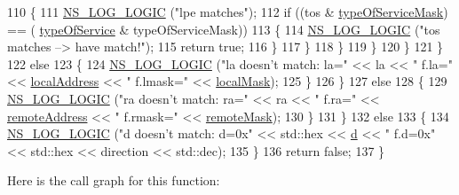 \begin{DoxyCode}
110                             \{
111                               \hyperlink{group__logging_ga88acd260151caf2db9c0fc84997f45ce}{NS\_LOG\_LOGIC} (\textcolor{stringliteral}{"lpe matches"});
112                               \textcolor{keywordflow}{if} ((tos & \hyperlink{structns3_1_1EpcTft_1_1PacketFilter_ad97ae3369224f9b909765a6fc473f3e2}{typeOfServiceMask}) == (
      \hyperlink{structns3_1_1EpcTft_1_1PacketFilter_abd62754182d9af89f6bc5fdc51a609ae}{typeOfService} & typeOfServiceMask))
113                                 \{
114                                   \hyperlink{group__logging_ga88acd260151caf2db9c0fc84997f45ce}{NS\_LOG\_LOGIC} (\textcolor{stringliteral}{"tos matches --> have match!"});
115                                   \textcolor{keywordflow}{return} \textcolor{keyword}{true};
116                                 \}
117                             \}
118                         \}
119                     \}
120                 \}
121             \}
122           \textcolor{keywordflow}{else}
123             \{
124               \hyperlink{group__logging_ga88acd260151caf2db9c0fc84997f45ce}{NS\_LOG\_LOGIC} (\textcolor{stringliteral}{"la doesn't match: la="} << la << \textcolor{stringliteral}{" f.la="} << 
      \hyperlink{structns3_1_1EpcTft_1_1PacketFilter_a091832baf650c7396dfedd456a847a06}{localAddress} << \textcolor{stringliteral}{" f.lmask="} << \hyperlink{structns3_1_1EpcTft_1_1PacketFilter_a419c4f19d00518a9bff3756859306c0b}{localMask});
125             \}
126         \}
127       \textcolor{keywordflow}{else}
128         \{
129           \hyperlink{group__logging_ga88acd260151caf2db9c0fc84997f45ce}{NS\_LOG\_LOGIC} (\textcolor{stringliteral}{"ra doesn't match: ra="} << ra << \textcolor{stringliteral}{" f.ra="} << 
      \hyperlink{structns3_1_1EpcTft_1_1PacketFilter_ac6b6b05436c19e55a9d64ff5d8ace9e5}{remoteAddress} << \textcolor{stringliteral}{" f.rmask="} << \hyperlink{structns3_1_1EpcTft_1_1PacketFilter_a776b963c9555b388893c5aaab0856afb}{remoteMask});
130         \}
131     \}
132   \textcolor{keywordflow}{else}
133     \{
134       \hyperlink{group__logging_ga88acd260151caf2db9c0fc84997f45ce}{NS\_LOG\_LOGIC} (\textcolor{stringliteral}{"d doesn't match: d=0x"} << std::hex << \hyperlink{buildings__pathloss_8m_a9f9b934daed17a4d3613b6886ff4cf4b}{d} << \textcolor{stringliteral}{" f.d=0x"} << std::hex << 
      direction << std::dec);
135     \}
136   \textcolor{keywordflow}{return} \textcolor{keyword}{false};      
137 \}
\end{DoxyCode}


Here is the call graph for this function\+:




